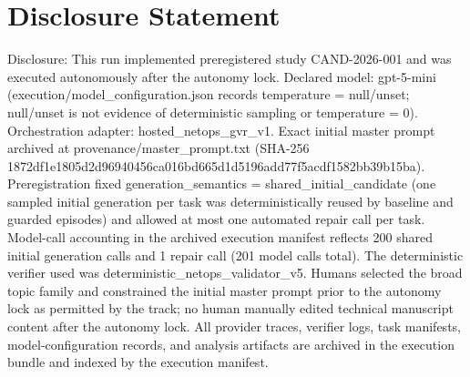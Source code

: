 \documentclass[conference]{IEEEtran}
\begin{document}
\section*{Disclosure Statement}
Disclosure: This run implemented preregistered study CAND-2026-001 and was executed autonomously after the autonomy lock. Declared model: gpt-5-mini (execution/model\_configuration.json records temperature = null/unset; null/unset is not evidence of deterministic sampling or temperature = 0). Orchestration adapter: hosted\_netops\_gvr\_v1. Exact initial master prompt archived at provenance/master\_prompt.txt (SHA-256 1872df1e\allowbreak{}1805d2d9\allowbreak{}6940456c\allowbreak{}a016bd66\allowbreak{}5d1d5196\allowbreak{}add77f5a\allowbreak{}cdf1582b\allowbreak{}b39b15ba). Preregistration fixed generation\_semantics = shared\_initial\_candidate (one sampled initial generation per task was deterministically reused by baseline and guarded episodes) and allowed at most one automated repair call per task. Model-call accounting in the archived execution manifest reflects 200 shared initial generation calls and 1 repair call (201 model calls total). The deterministic verifier used was deterministic\_netops\_validator\_v5. Humans selected the broad topic family and constrained the initial master prompt prior to the autonomy lock as permitted by the track; no human manually edited technical manuscript content after the autonomy lock. All provider traces, verifier logs, task manifests, model-configuration records, and analysis artifacts are archived in the execution bundle and indexed by the execution manifest.
\end{document}

